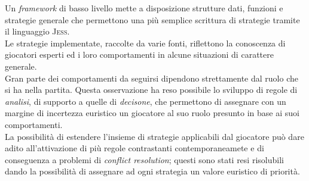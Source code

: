 Un \emph{framework} di basso livello mette a disposizione strutture dati, funzioni e strategie generale che permettono una più semplice scrittura di strategie tramite il linguaggio \textsc{Jess}.\\
Le strategie implementate, raccolte da varie fonti, riflettono la conoscenza di giocatori esperti ed i loro comportamenti in alcune situazioni di carattere generale.\\
Gran parte dei comportamenti da seguirsi dipendono strettamente dal ruolo che si ha nella partita. Questa osservazione ha reso possibile lo sviluppo di regole di \emph{analisi}, di supporto a quelle di \emph{decisone}, che permettono di assegnare con un margine di incertezza euristico un giocatore al suo ruolo presunto in base ai suoi comportamenti.\\
La possibilità di estendere l'insieme di strategie applicabili dal giocatore può dare adito all'attivazione di più regole contrastanti contemporaneamete e di conseguenza a problemi di \emph{conflict resolution}; questi sono stati resi risolubili dando la possibilità di assegnare ad ogni strategia un valore euristico di priorità.




